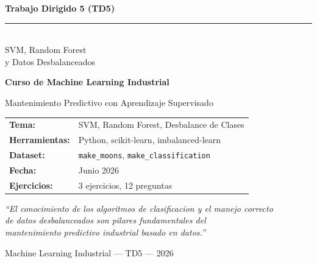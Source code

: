 \documentclass[12pt,a4paper]{article}
\begin{document}

\begin{titlepage}
  \centering
  \vspace*{2cm}

  {\Huge\bfseries\color{azulTDS}
    Trabajo Dirigido 5 (TD5)\\[0.6em]
    \rule{0.8\textwidth}{2pt}\\[0.6em]
    SVM, Random Forest\\y Datos Desbalanceados
  }

  \vspace{1.5cm}
  {\Large\bfseries\color{verdeTDS} Curso de Machine Learning Industrial}

  \vspace{0.8cm}
  {\large Mantenimiento Predictivo con Aprendizaje Supervisado}

  \vspace{2.5cm}

  \begin{tcolorbox}[colback=azulTDS!8, colframe=azulTDS, width=0.82\textwidth,
      left=12pt, right=12pt, top=10pt, bottom=10pt]
    \centering
    \begin{tabular}{ll}
      \textbf{Tema:}       & SVM, Random Forest, Desbalance de Clases \\[4pt]
      \textbf{Herramientas:} & Python, scikit-learn, imbalanced-learn   \\[4pt]
      \textbf{Dataset:}    & \texttt{make\_moons}, \texttt{make\_classification} \\[4pt]
      \textbf{Fecha:}      & Junio 2026                               \\[4pt]
      \textbf{Ejercicios:} & 3 ejercicios, 12 preguntas               \\
    \end{tabular}
  \end{tcolorbox}

  \vspace{2.5cm}

  {\large\itshape
    ``El conocimiento de los algoritmos de clasificacion y el manejo correcto\\
    de datos desbalanceados son pilares fundamentales del\\
    mantenimiento predictivo industrial basado en datos.''
  }

  \vfill
  {\small\color{gray} Machine Learning Industrial --- TD5 --- 2026}
\end{titlepage}
\end{document}
